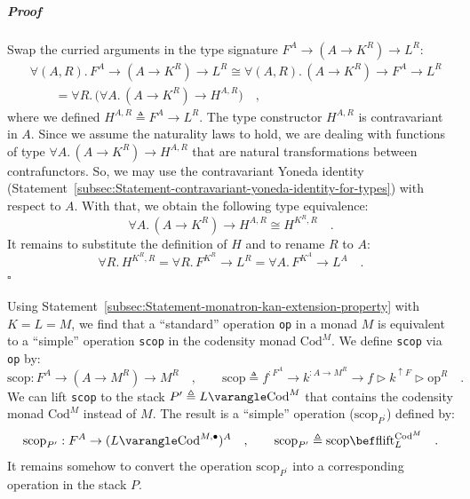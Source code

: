 \subparagraph{Proof}

Swap the curried arguments in the type signature $F^{A}\rightarrow(A\rightarrow K^{R})\rightarrow L^{R}$:
\begin{align*}
 & \forall(A,R).\,F^{A}\rightarrow(A\rightarrow K^{R})\rightarrow L^{R}\cong\forall(A,R).\,(A\rightarrow K^{R})\rightarrow F^{A}\rightarrow L^{R}\\
 & \quad\quad=\forall R.\,\big(\forall A.\,(A\rightarrow K^{R})\rightarrow H^{A,R}\big)\quad,
\end{align*}
where we defined $H^{A,R}\triangleq F^{A}\rightarrow L^{R}$. The
type constructor $H^{A,R}$ is contravariant in $A$. Since we assume
the naturality laws to hold, we are dealing with functions of type
$\forall A.\,(A\rightarrow K^{R})\rightarrow H^{A,R}$ that are natural
transformations between contrafunctors. So, we may use the contravariant
Yoneda identity (Statement~\ref{subsec:Statement-contravariant-yoneda-identity-for-types})
with respect to $A$. With that, we obtain the following type equivalence:
\[
\forall A.\,(A\rightarrow K^{R})\rightarrow H^{A,R}\cong H^{K^{R},R}\quad.
\]
It remains to substitute the definition of $H$ and to rename $R$
to $A$:
\[
\forall R.\,H^{K^{R},R}=\forall R.\,F^{K^{R}}\rightarrow L^{R}=\forall A.\,F^{K^{A}}\rightarrow L^{A}\quad.
\]
$\square$

Using Statement~\ref{subsec:Statement-monatron-kan-extension-property}
with $K=L=M$, we find that a \textsf{``}standard\textsf{''} operation \lstinline!op!
in a monad $M$ is equivalent to a \textsf{``}simple\textsf{''} operation \lstinline!scop!
in the codensity monad $\text{Cod}^{M}$. We define \lstinline!scop!
via \lstinline!op! by:
\begin{equation}
\text{scop}:F^{A}\rightarrow(A\rightarrow M^{R})\rightarrow M^{R}\quad,\quad\quad\text{scop}\triangleq f^{:F^{A}}\rightarrow k^{:A\rightarrow M^{R}}\rightarrow f\triangleright k^{\uparrow F}\triangleright\text{op}^{R}\quad.\label{eq:monatron-scop-via-op}
\end{equation}
We can lift \lstinline!scop! to the stack $P^{\prime}\triangleq L\varangle\text{Cod}^{M}$
that contains the codensity monad $\text{Cod}^{M}$ instead of $M$.
The result is a \textsf{``}simple\textsf{''} operation ($\text{scop}_{P^{\prime}}$)
defined by:
\[
\text{scop}_{P^{\prime}}:F^{A}\rightarrow(L\varangle\text{Cod}^{M,\bullet})^{A}\quad,\quad\quad\text{scop}_{P^{\prime}}\triangleq\text{scop}\bef\text{flift}_{L}^{\text{Cod}^{M}}\quad.
\]
It remains somehow to convert the operation $\text{scop}_{P^{\prime}}$
into a corresponding operation in the stack $P$.


